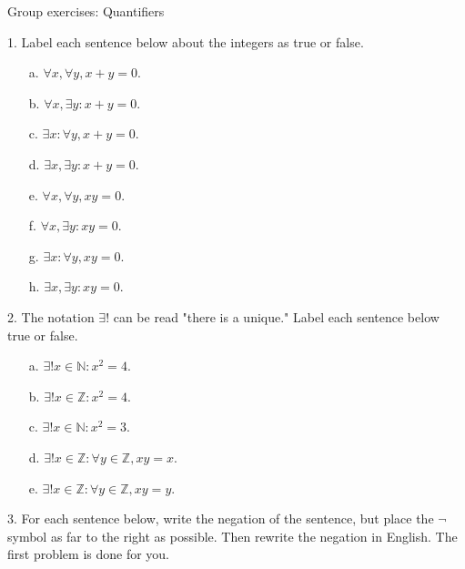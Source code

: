 \documentclass[10pt]{beamer}
\begin{document}
\begin{frame}{Group exercises: Quantifiers}

\footnotesize 
\begin{minipage}{0.56\textwidth}
    1. Label each sentence below about the integers as true or false. 
    \begin{itemize}
        \item[a.] $\forall x, \forall y, x+y=0.$ 
        \item[b.] $\forall x, \exists y: x+y=0.$
        \item[c.] $\exists x: \forall y, x+y=0.$
        \item[d.] $\exists x, \exists y: x+y=0.$
        \item[e.] $\forall x, \forall y, xy=0.$
        \item[f.] $\forall x, \exists y: xy=0.$
        \item[g.] $\exists x: \forall y, xy=0.$
        \item[h.] $\exists x, \exists y: xy=0.$
    \end{itemize}
    2. The notation $\exists!$ can be read "there is a unique." Label each sentence below true or false.
    \vspace{-0.5cm}
    \begin{itemize}
        \item[a.] $\exists! x \in \mathbb{N}: x^2=4.$ 
        \item[b.] $\exists! x \in \mathbb{Z}: x^2=4.$ 
        \item[c.] $\exists! x \in \mathbb{N}: x^2=3.$ 
        \item[d.] $\exists! x \in \mathbb{Z}: \forall y \in \mathbb{Z}, xy=x.$ 
        \item[e.] $\exists! x \in \mathbb{Z}: \forall y \in \mathbb{Z}, xy=y.$ 
    \end{itemize}
\end{minipage}
\hfill
\begin{minipage}{0.38\textwidth}
    3. For each sentence below, write the negation of the sentence, but place the $\lnot$ symbol as far to the right as possible. Then rewrite the negation in English.  The first problem is done for you.
    \begin{itemize}
    

\end{itemize}
\end{minipage}
\end{frame}
\end{document}
